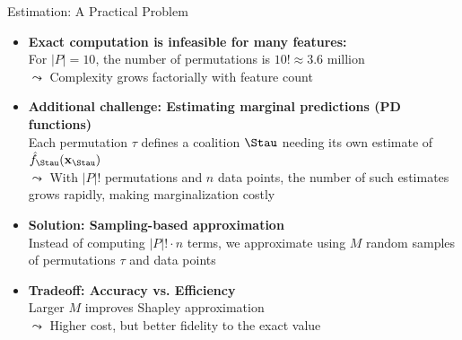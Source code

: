 \documentclass[10pt,compress,t,notes=noshow, xcolor=table]{beamer}
\begin{document}
\begin{frame}{Estimation: A Practical Problem}
\begin{itemize}[<+->]
  \item \textbf{Exact computation is infeasible for many features:}\\
        For $|P| = 10$, the number of permutations is $10! \approx 3.6$ million\\
        $\leadsto$ Complexity grows factorially with feature count

\item \textbf{Additional challenge: Estimating marginal predictions (PD functions)}\\
Each permutation $\tau$ defines a coalition $\Stau$ needing its own estimate of $\fh_{\Stau}(\xv_{\Stau})$\\
$\leadsto$ With $|P|!$ permutations and $n$ data points, the number of such estimates grows rapidly, making marginalization costly


  \item \textbf{Solution: Sampling-based approximation}\\
        Instead of computing $|P|! \cdot n$ terms, we approximate using $M$ random samples of permutations $\tau$ and data points

  \item \textbf{Tradeoff: Accuracy vs. Efficiency}\\
        Larger $M$ improves Shapley approximation\\
        $\leadsto$ Higher cost, but better fidelity to the exact value
\end{itemize}
\end{frame}


\newcommand{\xk}{\mathbf{x}^{(k)}}
\end{document}

